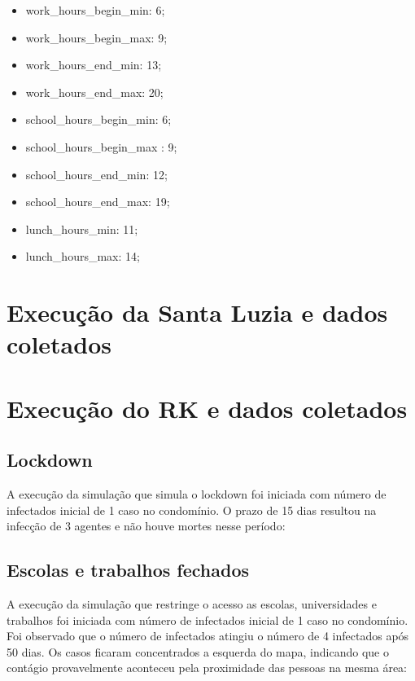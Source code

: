 \begin{itemize}
\item work\_hours\_begin\_min: 6;
\item work\_hours\_begin\_max: 9;
\item work\_hours\_end\_min: 13; 
\item work\_hours\_end\_max: 20;
\item school\_hours\_begin\_min: 6;
\item school\_hours\_begin\_max : 9;
\item school\_hours\_end\_min: 12;
\item school\_hours\_end\_max: 19;
\item lunch\_hours\_min: 11;
\item lunch\_hours\_max: 14;
\end{itemize}



\section{Execução da Santa Luzia e dados coletados}

\section{Execução do RK e dados coletados}

\subsection{Lockdown}

A execução da simulação que simula o lockdown foi iniciada com número de infectados inicial de 1 caso no condomínio. O prazo de 15 dias resultou na infecção de 3 agentes e não houve mortes nesse período:


\subsection{Escolas e trabalhos fechados}

A execução da simulação que restringe o acesso as escolas, universidades e trabalhos foi iniciada com número de infectados inicial de 1 caso no condomínio. Foi observado que o número de infectados atingiu o número de 4 infectados após 50 dias. Os casos ficaram concentrados a esquerda do mapa, indicando que o contágio provavelmente aconteceu pela proximidade das pessoas na mesma área:

